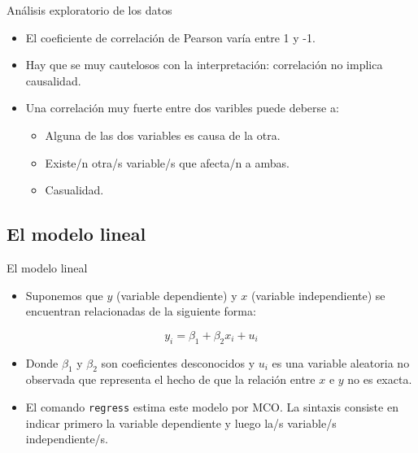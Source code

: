 \documentclass{beamer}
\begin{document}
\begin{frame}[allowframebreaks]{Análisis exploratorio de los datos}
\begin{itemize}
\begin{center}
\end{center}
\item El coeficiente de correlación de Pearson varía entre 1 y -1.
\item Hay que se muy cautelosos con la interpretación: correlación no implica causalidad.
\item Una correlación muy fuerte entre dos varibles puede deberse a: 
\begin{itemize}
\item Alguna de las dos variables es causa de la otra.
\item Existe/n otra/s variable/s que afecta/n a ambas.
\item Casualidad.
\end{itemize}
\end{itemize}
\end{frame}
\subsection{El modelo lineal}
\begin{frame}{El modelo lineal}
\begin{itemize}
\item Suponemos que $y$ (variable dependiente) y $x$ (variable independiente) se encuentran relacionadas de la siguiente forma: 
\end{itemize}
\begin{equation}
y_{i}=\beta_1 + \beta_2 x_{i} + u_{i}
\end{equation}
\begin{itemize}
\item Donde $\beta_1$ y $\beta_2$ son coeficientes desconocidos y $u_i$ es una variable aleatoria no observada que representa el hecho de que la relación entre $x$ e $y$ no es exacta.
\item El comando \texttt{regress} estima este modelo por MCO. La sintaxis consiste en indicar primero la variable dependiente y luego la/s variable/s independiente/s.
\end{itemize}
\end{frame}
\end{document}

